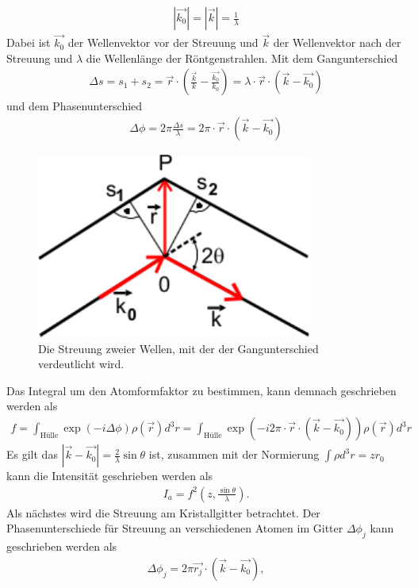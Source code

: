 \begin{align}
	|\vec{k_0}|=|\vec{k}|=\frac{1}{\lambda}
\end{align}
Dabei ist $\vec{k_0}$ der Wellenvektor vor der Streuung und $\vec{k}$ der Wellenvektor nach der Streuung und $\lambda$ die Wellenlänge der Röntgenstrahlen.
Mit dem Gangunterschied
\begin{align}
	\Delta s = s_1 + s_2= \vec{r}\cdot\left( \frac{\vec{k}}{k}-\frac{\vec{k_0}}{k_0}\right)=\lambda\cdot\vec{r}\cdot\left(\vec{k}-\vec{k_0}\right)
\end{align}
und dem Phasenunterschied
\begin{align}
	\Delta \phi = 2\pi \frac{\Delta s}{\lambda}=2\pi\cdot\vec{r}\cdot\left(\vec{k}-\vec{k_0}\right)
\end{align}
\begin{figure}
	\centering
	\includegraphics[scale = 1]{../Grafiken/StreuungUnterschied.pdf}
	\caption{Die Streuung zweier Wellen, mit der der Gangunterschied verdeutlicht wird\cite{V41}.}\label{fig:Gangunterschied}
\end{figure}
Das Integral um den Atomformfaktor zu bestimmen, kann demnach geschrieben werden als
\begin{align}
	f=\int_{\text{Hülle}}\exp(-i\Delta \phi)\rho(\vec{r})d^3r=\int_{\text{Hülle}}\exp(-i2\pi\cdot\vec{r}\cdot\left(\vec{k}-\vec{k_0}\right))\rho(\vec{r})d^3r
\end{align}
Es gilt das $|\vec{k}-\vec{k_0}| =\frac{2}{\lambda}\sin\theta$ ist, zusammen mit der Normierung $\int \rho d^3r = zr_0$ kann die Intensität geschrieben werden als
\begin{align}
	I_a=f^2\left(z, \frac{\sin\theta}{\lambda} \right).
\end{align}
Als nächstes wird die Streuung am Kristallgitter betrachtet. Der Phasenunterschiede für Streuung an verschiedenen Atomen im Gitter $\Delta \phi_j$ kann geschrieben werden als 
\begin{align}
	\Delta \phi_j = 2\pi \vec{r_j}\cdot\left(\vec{k}-\vec{k_0}\right),
\end{align}
